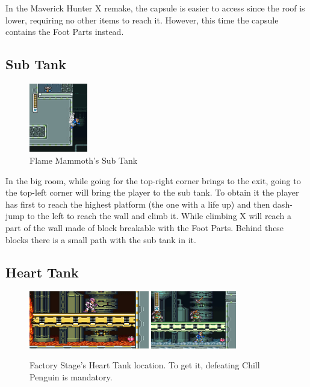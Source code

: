In the Maverick Hunter X remake, the capsule is easier to access since the roof is lower, requiring no other items to reach it. However, this time the capsule contains the Foot Parts instead.

\subsection{Sub Tank}
\begin{figure}[htp]
	\centering
	\includegraphics[height=3cm]{figures/X1/Flame_mammoth/Flame_tank.jpg}
	\caption{Flame Mammoth's Sub Tank}
\end{figure}

In the big room, while going for the top-right corner brings to the exit, going to the top-left corner will bring the player to the sub tank. To obtain it the player has first to reach the highest platform (the one with a life up) and then dash-jump to the left to reach the wall and climb it. While climbing X will reach a part of the wall made of block breakable with the Foot Parts. Behind these blocks there is a small path with the sub tank in it.

\subsection{Heart Tank}
\begin{figure}[htp]
	\centering
		\centering
		\includegraphics[height=2.5cm]{figures/X1/Flame_mammoth/Flame_heart_1.jpg}
		\includegraphics[height=2.5cm]{figures/X1/Flame_mammoth/Flame_heart_2.jpg}
	\caption{Factory Stage's Heart Tank location. To get it, defeating Chill Penguin is mandatory.}
\end{figure}

